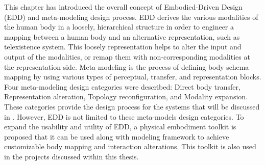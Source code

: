 This chapter has introduced the overall concept of Embodied-Driven Design (EDD) and meta-modeling design process. EDD derives the various modalities of the human body in a loosely, hierarchical structure in order to engineer a mapping between a human body and an alternative representation, such as telexistence system. This loosely representation helps to alter the input and output of the modalities, or remap them with non-corresponding modalities at the representation side. Meta-modeling is the process of defining body schema mapping by using various types of perceptual, transfer, and representation blocks. Four meta-modeling design categories were described: Direct body transfer, Representation alteration, Topology reconfiguration, and Modality expansion. These categories provide the design process for the systems that will be discussed in . However, EDD is not limited to these meta-models design categories. To expand the usability and utility of EDD, a physical embodiment toolkit is proposed that it can be used along with modeling framework to achieve customizable body mapping and interaction alterations. This toolkit is also used in the projects discussed within this thesis.




